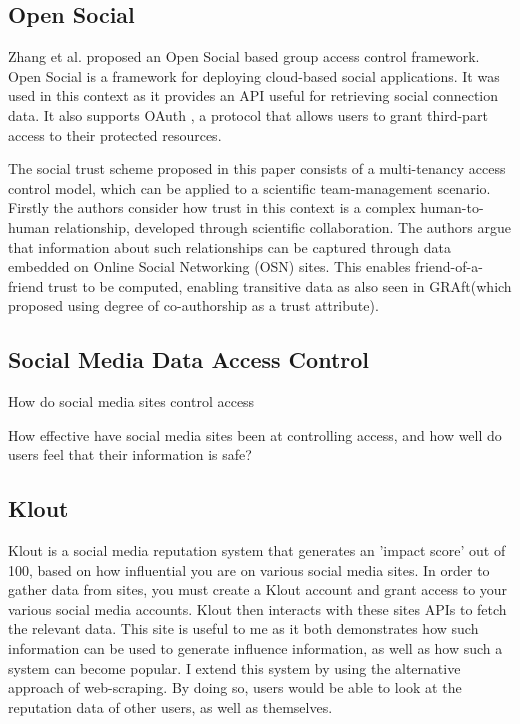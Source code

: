 \subsection{Open Social}

Zhang et al. \cite{} proposed an Open Social based group access control framework. Open Social is a framework for deploying cloud-based social applications. It was used in this context as it provides an API useful for retrieving social connection data. It also supports OAuth \cite{}, a protocol that allows users to grant third-part access to their protected resources.

The social trust scheme proposed in this paper consists of a multi-tenancy access control model, which can be applied to a scientific team-management scenario. Firstly the authors consider how trust in this context is a complex human-to-human relationship, developed through scientific collaboration. The authors argue that information about such relationships can be captured through data embedded on Online Social Networking (OSN) sites. This enables friend-of-a-friend trust to be computed, enabling transitive data as also seen in GRAft(which proposed using degree of co-authorship as a trust attribute).

\subsection{Social Media Data Access Control}

How do social media sites control access

How effective have social media sites been at controlling access, and how well do users feel that their information is safe?


\subsection{Klout}

Klout \cite{} is a social media reputation system that generates an 'impact score' out of 100, based on how influential you are on various social media sites. In order to gather data from sites, you must create a Klout account and grant access to your various social media accounts. Klout then interacts with these sites APIs to fetch the relevant data. This site is useful to me as it both demonstrates how such information can be used to generate influence information, as well as how such a system can become popular. I extend this system by using the alternative approach of web-scraping. By doing so, users would be able to look at the reputation data of other users, as well as themselves. 

